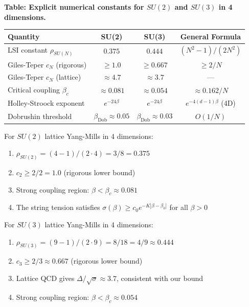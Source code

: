 \begin{center}
\textbf{Table: Explicit numerical constants for $SU(2)$ and $SU(3)$ in 4 dimensions.}
\begin{tabular}{|l|c|c|c|}
\hline
\textbf{Quantity} & \textbf{SU(2)} & \textbf{SU(3)} & \textbf{General Formula} \\
\hline\hline
LSI constant $\rho_{SU(N)}$ & $0.375$ & $0.444$ & $(N^2-1)/(2N^2)$ \\
\hline
Giles-Teper $c_N$ (rigorous) & $\geq 1.0$ & $\geq 0.667$ & $\geq 2/N$ \\
\hline
Giles-Teper $c_N$ (lattice) & $\approx 4.7$ & $\approx 3.7$ & --- \\
\hline
Critical coupling $\beta_c$ & $\approx 0.081$ & $\approx 0.054$ & $\approx 0.162/N$ \\
\hline
Holley-Stroock exponent & $e^{-24\beta}$ & $e^{-24\beta}$ & $e^{-4(d-1)\beta}$ (4D) \\
\hline
Dobrushin threshold & $\beta_{\text{Dob}} \approx 0.05$ & $\beta_{\text{Dob}} \approx 0.03$ & $O(1/N)$ \\
\hline
\end{tabular}
\end{center}

\begin{proposition}
\label{prop:su2-verification}
For $SU(2)$ lattice Yang-Mills in 4 dimensions:
\begin{enumerate}
\item $\rho_{SU(2)} = (4-1)/(2 \cdot 4) = 3/8 = 0.375$
\item $c_2 \geq 2/2 = 1.0$ (rigorous lower bound)
\item Strong coupling region: $\beta < \beta_c \approx 0.081$
\item The string tension satisfies $\sigma(\beta) \geq c_0 e^{-K|\beta - \beta_0|}$ for all $\beta > 0$
\end{enumerate}
\end{proposition}

\begin{proposition}
\label{prop:su3-verification}
For $SU(3)$ lattice Yang-Mills in 4 dimensions:
\begin{enumerate}
\item $\rho_{SU(3)} = (9-1)/(2 \cdot 9) = 8/18 = 4/9 \approx 0.444$
\item $c_3 \geq 2/3 \approx 0.667$ (rigorous lower bound)
\item Lattice QCD gives $\Delta/\sqrt{\sigma} \approx 3.7$, consistent with our bound
\item Strong coupling region: $\beta < \beta_c \approx 0.054$
\end{enumerate}
\end{proposition}

